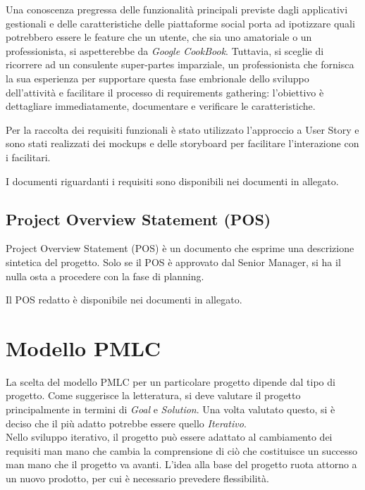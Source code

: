 Una conoscenza pregressa delle funzionalità principali previste dagli applicativi gestionali e delle caratteristiche delle 
piattaforme social porta ad ipotizzare quali potrebbero essere le feature che un utente, che sia uno amatoriale o un 
professionista, si aspetterebbe da \textit{Google CookBook}.
Tuttavia, si sceglie di ricorrere ad un consulente super-partes imparziale, un professionista che fornisca la sua esperienza 
per supportare questa fase embrionale dello sviluppo dell'attività e facilitare il processo di requirements gathering: 
l'obiettivo è dettagliare immediatamente, documentare e verificare le caratteristiche.

Per la raccolta dei requisiti funzionali è stato utilizzato l'approccio a User Story e sono stati realizzati dei mockups e 
delle storyboard per facilitare l'interazione con i facilitari.

I documenti riguardanti i requisiti sono disponibili nei documenti in allegato.

\subsection{Project Overview Statement (POS)}

Project Overview Statement (POS) è un documento che esprime una descrizione sintetica del progetto.
Solo se il POS è approvato dal Senior Manager, si ha il nulla osta a procedere con la fase di planning.

Il POS redatto è disponibile nei documenti in allegato.


\section{Modello PMLC}
La scelta del modello PMLC per un particolare progetto dipende dal tipo di progetto.
Come suggerisce la letteratura, si deve valutare il progetto principalmente in termini di \textit{Goal} e 
\textit{Solution}.
Una volta valutato questo, si è deciso che il più adatto potrebbe essere quello \textit{Iterativo}.\\
Nello sviluppo iterativo, il progetto può essere adattato al cambiamento dei requisiti man mano che cambia 
la comprensione di ciò che costituisce un successo man mano che il progetto va avanti.
L'idea alla base del progetto ruota attorno a un nuovo prodotto, per cui è necessario prevedere flessibilità.
